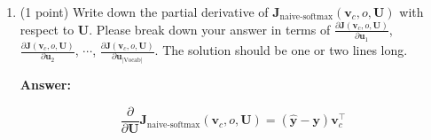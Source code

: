 \documentclass{article}
\newenvironment{answer}{
    {\bf Answer:} \sf \begingroup\color{black}
}{\endgroup}%
\begin{document}
\begin{enumerate}[label=(\alph*)]
          \begin{shaded}
              \begin{answer}
                  \begin{itemize}
                      \item $w = o:$ \\
                            \begin{equation}
                                \frac{\partial}{\partial \bm u_{o}}\bm J_{\text{naive-softmax}}(\bm v_c, o, \bm U)
                                = -\bm v_c + \frac{\bm v_{c} \exp(\bm u_{o}^\top \bm v_{c})}{\sum_{w \in \text{Vocab}} \exp(\bm u_{w}^\top \bm v_{c})}
                                = \bm v_{c} (\hat{\bm y}_o - 1)
                            \end{equation}
                      \item $w \neq o:$ \\
                            \begin{equation}
                                \frac{\partial}{\partial \bm u_{w}}\bm J_{\text{naive-softmax}}(\bm v_c, o, \bm U)
                                = \frac{\bm v_{c} \exp(\bm u_{w}^\top \bm v_{c})}{\sum_{w' \in \text{Vocab}} \exp(\bm u_{w'}^\top \bm v_{c})}
                                = \bm v_{c} \hat{\bm y}_w
                            \end{equation}
                  \end{itemize}
              \end{answer}
          \end{shaded}

    \item (1 point) Write down the partial derivative of $\bm J_{\text{naive-softmax}}(\bm v_c, o, \bm U)$ with respect to $\bm U$. Please break down your answer in terms of $\frac{\partial \bm J(\bm v_c, o, \bm U)}{\partial \bm u_1}$, $\frac{\partial \bm J(\bm v_c, o, \bm U)}{\partial \bm u_2}$, $\cdots$, $\frac{\partial \bm J(\bm v_c, o, \bm U)}{\partial \bm u_{|\text{Vocab}|}}$. The solution should be one or two lines long.

          \begin{shaded}
              \begin{answer}
                  \begin{equation}
                      \frac{\partial}{\partial \bm U}\bm J_{\text{naive-softmax}}(\bm v_c, o, \bm U)
                      = (\bm \hat{\bm y} - \bm y)\bm v_{c}^\top
                  \end{equation}
              \end{answer}
          \end{shaded}


\end{enumerate}
\end{document}
